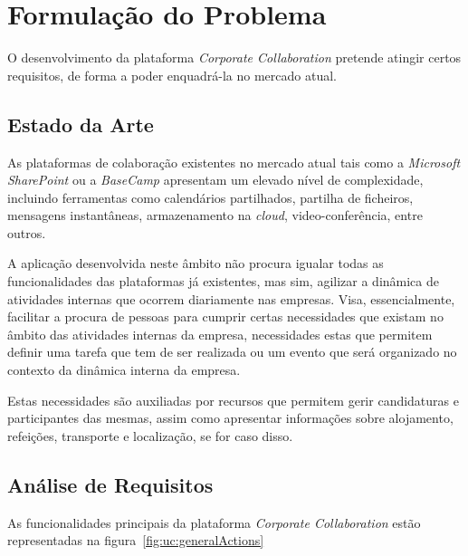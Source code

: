 \chapter{Formulação do Problema}\label{chapter:formulacaoDoProblema}

O desenvolvimento da plataforma \textit{Corporate Collaboration} pretende atingir certos requisitos, de forma a poder enquadrá-la no mercado 
atual. 


\section{Estado da Arte}\label{sec:estadoDaArte}
As plataformas de colaboração existentes no mercado atual tais como a \textit{Microsoft SharePoint} ou a \textit{BaseCamp} apresentam um elevado nível de complexidade, 
incluindo ferramentas como calendários partilhados, partilha de ficheiros, mensagens instantâneas, armazenamento na \textit{cloud}, video-conferência, entre outros. 

\par
A aplicação desenvolvida neste âmbito não procura igualar todas as funcionalidades das plataformas já existentes, 
mas sim, agilizar a dinâmica de atividades internas que ocorrem diariamente nas empresas. 
Visa, essencialmente, facilitar a procura de pessoas para cumprir certas necessidades que existam no âmbito das atividades internas da empresa, 
necessidades estas que permitem definir uma tarefa que tem de ser realizada ou um evento que será organizado no contexto da dinâmica interna da empresa. 

\par 
Estas necessidades são auxiliadas por recursos que permitem gerir candidaturas e participantes das mesmas, 
assim como apresentar informações sobre alojamento, refeições, transporte e localização, se for caso disso.

\section{Análise de Requisitos}\label{sec:requisitos}

As funcionalidades principais da plataforma \textit{Corporate Collaboration} estão representadas na figura~\ref{fig:uc:generalActions}

